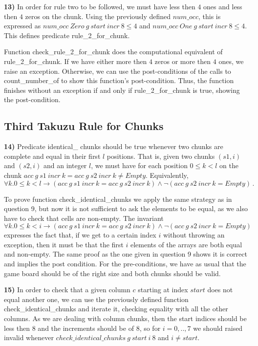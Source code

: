 \documentclass[]{StandardTemplate}
\begin{document}
\textbf{13)} In order for rule two to be followed, we must have less then $ 4 $ ones and less then $ 4 $ zeros on the chunk. Using the previously defined $ num\_occ $, this is expressed as $ num\_occ~Zero~g~start~incr~8 \leq 4$ and $ num\_occ~One~g~start~incr~8 \leq 4  $. This defines predicate rule\_2\_for\_chunk.

Function check\_rule\_2\_for\_chunk does the computational equivalent of rule\_2\_for\_chunk. If we have either more then $ 4 $ zeros or more then $ 4 $ ones, we raise an exception. Otherwise, we can use the post-conditions of the calls to count\_number\_of to show this function's post-condition. Thus, the function finishes without an exception if and only if rule\_2\_for\_chunk is true, showing the post-condition.

\subsection{Third Takuzu Rule for Chunks}
\label{subsec:labelw}


\textbf{14)} Predicate identical\_ chunks should be true whenever two chunks are complete and equal in their first $ l $ positions. That is, given two chunks $ (s1,i) $ and $ (s2,i) $ and an integer $ l $, we must have for each position $ 0 \leq k < l $  on the chunk $ acc~g~s1~incr~k=acc~g~s2~incr~k \neq Empty $. Equivalently, \[
\forall k. 0 \leq k < l \to (acc~g~s1~incr~k=acc~g~s2~incr~k) \land \neg(acc~g~s2~incr~k  = Empty)
  \,.\]

To prove function check\_identical\_chunks we apply the same strategy as in question 9, but now it is not sufficient to ask the elements to be equal, as we also have to check that cells are non-empty. The invariant \[
\forall k. 0 \leq k < i \to (acc~g~s1~incr~k=acc~g~s2~incr~k) \land \neg(acc~g~s2~incr~k  = Empty)
\]expresses the fact that, if we get to a certain index $ i $ without throwing an exception, then it must be that the first $ i $ elements of the arrays are both equal and non-empty. The same proof as the one given in question 9 shows it is correct and implies the post condition. For the pre-conditions, we have as usual that the game board should be of the right size and both chunks should be valid.

\textbf{15)} In order to check that a given column $ c $ starting at index $ start $ does not equal another one, we can use the previously defined function check\_identical\_chunks and iterate it, checking equality with all the other columns. As we are dealing with column chunks, then the start indices should be less then $ 8 $ and the increments should be of $ 8$, so for $ i=0,..,7 $ we should raised invalid whenever $ check\_identical\_chunks~g~start~i~8  $ and $  i \neq start$.
\end{document}
